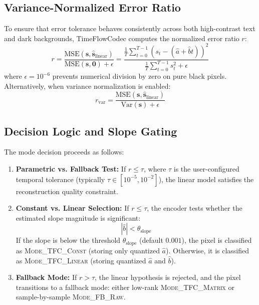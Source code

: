 \subsection{Variance-Normalized Error Ratio}
To ensure that error tolerance behaves consistently across both high-contrast text and dark backgrounds, TimeFlowCodec computes the normalized error ratio $r$:
\begin{equation}
    r = \frac{\text{MSE}(\mathbf{s}, \hat{\mathbf{s}}_{\text{linear}})}{\text{MSE}(\mathbf{s}, \mathbf{0}) + \epsilon} = \frac{\frac{1}{T} \sum_{t=0}^{T-1} (s_t - (\hat{a} + \hat{b}t))^2}{\frac{1}{T} \sum_{t=0}^{T-1} s_t^2 + \epsilon}
\end{equation}
where $\epsilon = 10^{-6}$ prevents numerical division by zero on pure black pixels. Alternatively, when variance normalization is enabled:
\begin{equation}
    r_{\text{var}} = \frac{\text{MSE}(\mathbf{s}, \hat{\mathbf{s}}_{\text{linear}})}{\text{Var}(\mathbf{s}) + \epsilon}
\end{equation}

\subsection{Decision Logic and Slope Gating}
The mode decision proceeds as follows:
\begin{enumerate}
    \item \textbf{Parametric vs. Fallback Test:} If $r \le \tau$, where $\tau$ is the user-configured temporal tolerance (typically $\tau \in [10^{-5}, 10^{-2}]$), the linear model satisfies the reconstruction quality constraint.
    \item \textbf{Constant vs. Linear Selection:} If $r \le \tau$, the encoder tests whether the estimated slope magnitude is significant:
    \begin{equation}
        |\hat{b}| < \theta_{\text{slope}}
    \end{equation}
    If the slope is below the threshold $\theta_{\text{slope}}$ (default $0.001$), the pixel is classified as \textsc{Mode\_TFC\_Const} (storing only quantized $\hat{a}$). Otherwise, it is classified as \textsc{Mode\_TFC\_Linear} (storing quantized $\hat{a}$ and $\hat{b}$).
    \item \textbf{Fallback Mode:} If $r > \tau$, the linear hypothesis is rejected, and the pixel transitions to a fallback mode: either low-rank \textsc{Mode\_TFC\_Matrix} or sample-by-sample \textsc{Mode\_FB\_Raw}.
\end{enumerate}

